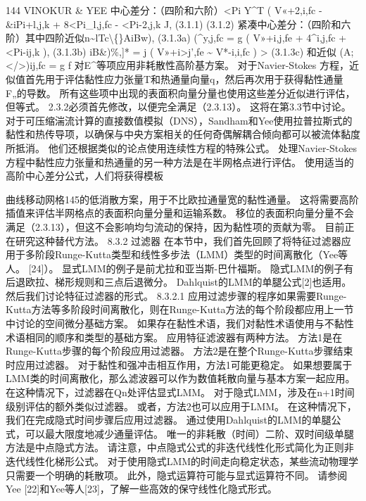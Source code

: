 \documentclass[UTF8,11pt,a4paper,openany,fontset=fandol]{ctexbook}
\begin{document}
144 VINOKUR \& YEE 中心差分：（四阶和六阶）<Pi Y\textasciicircum{}T ( V«+2,i,fc - \&iPi+l,j,k + 8<Pi\_l,j,fc - <Pi-2,j,k J, (3.1.1) (3.1.2) 紧凑中心差分：（四阶和六阶）其中四阶近似n\textasciitilde{}lTc\textbackslash\{\}AiBw), (3.1.3a) (\textasciicircum{}y,j,fc = g ( V»+i,j,fe + 4\textasciicircum{}i,j,fc + <Pi-ij,k ), (3.1.3b) iB\&)\%,]* = j ( V»+i>j',fe \textasciitilde{} V*-i,i,fc ) > (3.1.3c) 和近似 (A;</>)ij,fc = g f 对E\textasciicircum{}等项应用非耗散性高阶基方案。 对于Navier-Stokes 方程，近似值首先用于评估黏性应力张量T和热通量向量q，然后再次用于获得黏性通量F„的导数。 所有这些项中出现的表面积向量分量也使用这些差分近似进行评估，但等式。 2.3.2必须首先修改，以便完全满足（2.3.13）。 这将在第3.3节中讨论。 对于可压缩湍流计算的直接数值模拟（DNS），Sandham和Yee使用拉普拉斯式的黏性和热传导项，以确保与中央方案相关的任何奇偶解耦合倾向都可以被流体黏度所抵消。 他们还根据类似的论点使用连续性方程的特殊公式。 处理Navier-Stokes 方程中黏性应力张量和热通量的另一种方法是在半网格点进行评估。 使用适当的高阶中心差分公式，人们将获得模板

曲线移动网格145的低消散方案，用于不比欧拉通量宽的黏性通量。 这将需要高阶插值来评估半网格点的表面积向量分量和运输系数。 移位的表面积向量分量不会满足（2.3.13），但这不会影响均匀流动的保持，因为黏性项的贡献为零。 目前正在研究这种替代方法。 8.3.2 过滤器 在本节中，我们首先回顾了将特征过滤器应用于多阶段Runge-Kutta类型和线性多步法（LMM）类型的时间离散化（Yee等人。 [24]）。 显式LMM的例子是前尤拉和亚当斯-巴什福斯。 隐式LMM的例子有后退欧拉、梯形规则和三点后退微分。 Dahlquist的LMM的单腿公式[2]也适用。 然后我们讨论特征过滤器的形式。 8.3.2.1 应用过滤步骤的程序如果需要Runge-Kutta方法等多阶段时间离散化，则在Runge-Kutta方法的每个阶段都应用上一节中讨论的空间微分基础方案。 如果存在黏性术语，我们对黏性术语使用与不黏性术语相同的顺序和类型的基础方案。 应用特征滤波器有两种方法。 方法1是在Runge-Kutta步骤的每个阶段应用过滤器。 方法2是在整个Runge-Kutta步骤结束时应用过滤器。 对于黏性和强冲击相互作用，方法1可能更稳定。 如果想要属于LMM类的时间离散化，那么滤波器可以作为数值耗散向量与基本方案一起应用。 在这种情况下，过滤器在Qn处评估显式LMM。 对于隐式LMM，涉及在n+1时间级别评估的额外类似过滤器。 或者，方法2也可以应用于LMM。 在这种情况下，我们在完成隐式时间步骤后应用过滤器。 通过使用Dahlquist的LMM的单腿公式，可以最大限度地减少通量评估。 唯一的非耗散（时间）二阶、双时间级单腿方法是中点隐式方法。 请注意，中点隐式公式的非迭代线性化形式简化为正则非迭代线性化梯形公式。 对于使用隐式LMM的时间走向稳定状态，某些流动物理学只需要一个明确的耗散项。 此外，隐式运算符可能与显式运算符不同。 请参阅Yee [22]和Yee等人[23]，了解一些高效的保守线性化隐式形式。
\end{document}
